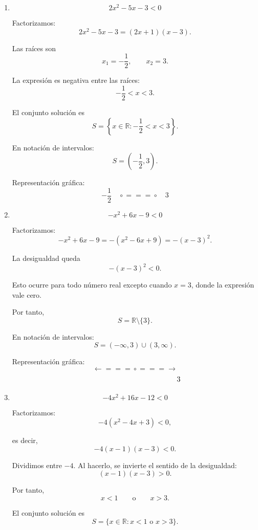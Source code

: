 \documentclass[12pt]{article}
\theoremstyle{plain}
\theoremstyle{definition}
\theoremstyle{remark}
\begin{document}
{\begin{enumerate}
El conjunto solución es
\[
\boxed{
S=\{x\in\mathbb{R}:1<x<3\}.
}
\]

En notación de intervalos:
\[
\boxed{
S=(1,3).
}
\]

Representación gráfica:
\[
1\quad
\circ\!\!=\!\!=\!\!=\!\circ
\quad3
\]

\item
\[
2x^2-5x-3<0
\]

Factorizamos:
\[
2x^2-5x-3=(2x+1)(x-3).
\]

Las raíces son
\[
x_1=-\frac{1}{2},
\qquad
x_2=3.
\]

La expresión es negativa entre las raíces:
\[
-\frac{1}{2}<x<3.
\]

El conjunto solución es
\[
\boxed{
S=
\left\{
x\in\mathbb{R}:
-\frac{1}{2}<x<3
\right\}.
}
\]

En notación de intervalos:
\[
\boxed{
S=
\left(-\frac{1}{2},3\right).
}
\]

Representación gráfica:
\[
-\frac{1}{2}\quad
\circ\!\!=\!\!=\!\!=\!\circ
\quad3
\]

\item
\[
-x^2+6x-9<0
\]

Factorizamos:
\[
-x^2+6x-9
=
-(x^2-6x+9)
=
-(x-3)^2.
\]

La desigualdad queda
\[
-(x-3)^2<0.
\]

Esto ocurre para todo número real excepto cuando \(x=3\), donde la
expresión vale cero.

Por tanto,
\[
\boxed{
S=\mathbb{R}\setminus\{3\}.
}
\]

En notación de intervalos:
\[
\boxed{
S=(-\infty,3)\cup(3,\infty).
}
\]

Representación gráfica:
\[
\longleftarrow\!\!=\!\!=\!\!=\!\circ\!\!=\!\!=\!\!=\!\longrightarrow
\]
\[
\hspace{4.3cm}3
\]

\item
\[
-4x^2+16x-12<0
\]

Factorizamos:
\[
-4(x^2-4x+3)<0,
\]

es decir,
\[
-4(x-1)(x-3)<0.
\]

Dividimos entre \(-4\). Al hacerlo, se invierte el sentido de la
desigualdad:
\[
(x-1)(x-3)>0.
\]

Por tanto,
\[
x<1
\qquad\text{o}\qquad
x>3.
\]

El conjunto solución es
\[
\boxed{
S=
\{x\in\mathbb{R}:x<1\text{ o }x>3\}.
}
\]


\end{enumerate}}
\end{document}
